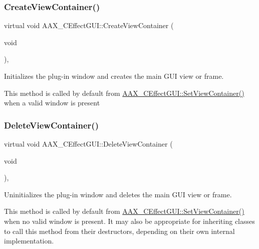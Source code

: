 \subsubsection{\texorpdfstring{CreateViewContainer()}{CreateViewContainer()}}
{\footnotesize\ttfamily virtual void A\+A\+X\+\_\+\+C\+Effect\+G\+U\+I\+::\+Create\+View\+Container (\begin{DoxyParamCaption}\item[{void}]{ }\end{DoxyParamCaption})\hspace{0.3cm}{\ttfamily [protected]}, {}}



Initializes the plug-\/in window and creates the main G\+UI view or frame. 

This method is called by default from \mbox{\hyperlink{a01477_a5ba8d0cf5326583ed9e2a4b9752e4287}{A\+A\+X\+\_\+\+C\+Effect\+G\+U\+I\+::\+Set\+View\+Container()}} when a valid window is present \mbox{\label{a01477_a56632ebf59c5ef3f4fe3d7d76da27a37}} 
\subsubsection{\texorpdfstring{DeleteViewContainer()}{DeleteViewContainer()}}
{\footnotesize\ttfamily virtual void A\+A\+X\+\_\+\+C\+Effect\+G\+U\+I\+::\+Delete\+View\+Container (\begin{DoxyParamCaption}\item[{void}]{ }\end{DoxyParamCaption})\hspace{0.3cm}{\ttfamily [protected]}, {}}



Uninitializes the plug-\/in window and deletes the main G\+UI view or frame. 

This method is called by default from \mbox{\hyperlink{a01477_a5ba8d0cf5326583ed9e2a4b9752e4287}{A\+A\+X\+\_\+\+C\+Effect\+G\+U\+I\+::\+Set\+View\+Container()}} when no valid window is present. It may also be appropriate for inheriting classes to call this method from their destructors, depending on their own internal implementation. \mbox{\label{a01477_a172074a301ac9c771443b4b63a5b426b}} 
